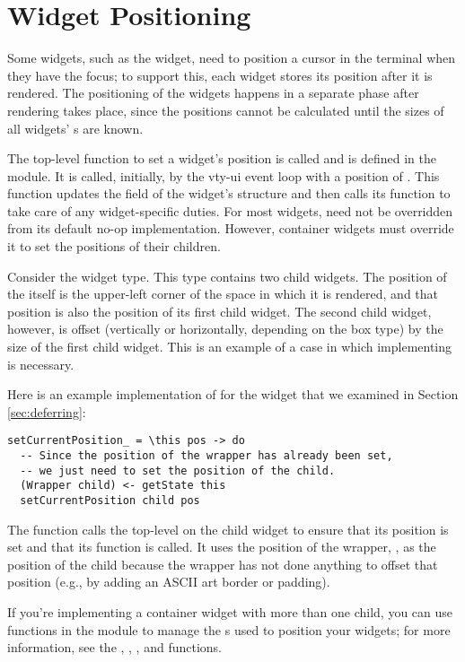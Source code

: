 \section{Widget Positioning}

Some widgets, such as the  widget, need to position a cursor
in the terminal when they have the focus; to support this, each widget
stores its position after it is rendered.  The positioning of the
widgets happens in a separate phase after rendering takes place, since
the positions cannot be calculated until the sizes of all widgets'
s are known.

The top-level function to set a widget's position is called
 and is defined in the  module.  It is
called, initially, by the vty-ui event loop with a position of .  This function updates the  field of the
widget's  structure and then calls its
 function to take care of any widget-specific
duties.  For most widgets,  need not be
overridden from its default no-op implementation.  However, container
widgets must override it to set the positions of their children.

Consider the  widget type.  This type contains two child
widgets.  The position of the  itself is the upper-left corner
of the space in which it is rendered, and that position is also the
position of its first child widget.  The second child widget, however,
is offset (vertically or horizontally, depending on the box type) by
the size of the first child widget.  This is an example of a case in
which implementing  is necessary.

Here is an example implementation of  for the
 widget that we examined in Section \ref{sec:deferring}:

\begin{verbatim}
setCurrentPosition_ = \this pos -> do
  -- Since the position of the wrapper has already been set,
  -- we just need to set the position of the child.
  (Wrapper child) <- getState this
  setCurrentPosition child pos
\end{verbatim}

The function calls the top-level  on the child
widget to ensure that its position is set and that its
 function is called.  It uses the position of
the wrapper, , as the position of the child because the
wrapper has not done anything to offset that position (e.g., by adding
an ASCII art border or padding).

If you're implementing a container widget with more than one child,
you can use functions in the  module to manage the
s used to position your widgets; for more
information, see the , , ,
and  functions.

